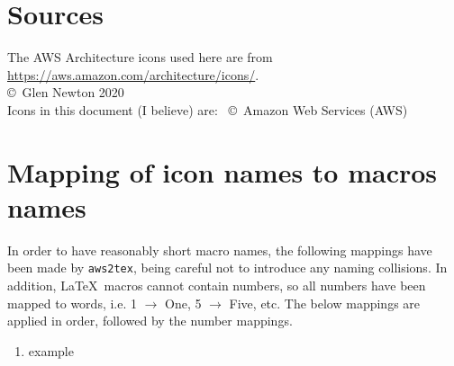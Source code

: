 \documentclass[12pt]{article}
\begin{document}
\section{Sources}
The AWS Architecture icons used here are from \url{https://aws.amazon.com/architecture/icons/}.\\
%

\vspace{3cm}
\noindent \copyright\ Glen Newton 2020\\
Icons in this document (I believe) are: \ \copyright\ Amazon Web Services (AWS)
\vspace{5mm}

\setlength{\parindent}{0pt}

\begin{multicols}{2}\footnotesize

\end{multicols}\clearpage

\normalsize

\appendix
\section{Mapping of icon names to macros names}
In order to have reasonably short macro names, the following mappings have been made by \texttt{aws2tex}, being careful not to introduce any naming collisions.
In addition, \LaTeX\ macros cannot contain numbers, so all numbers have been mapped to words, i.e. 1 $\rightarrow$ One, 5 $\rightarrow$ Five, etc.
The below mappings are applied in order, followed by the number mappings.
{\tiny
\begin{multicols}{3}
  \begin{enumerate}
  \item example
  \end{enumerate}
\end{multicols}
}

\printindex
\printindex[macros]
\end{document}
